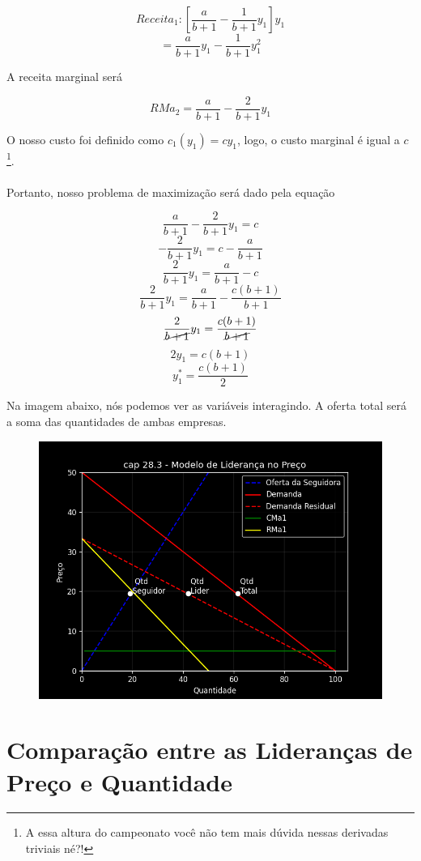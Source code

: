 \documentclass[a4paper,11pt,oneside]{book}
\theoremstyle{definition}
\theoremstyle{break}
\begin{document}
$$ Receita_1: \left[ \frac{a}{b+1} - \frac{1}{b+1}y_1 \right] y_1 $$
$$ = \frac{a}{b+1}y_1 - \frac{1}{b+1}y_1^2 $$

A receita marginal será

$$ RMa_2 = \frac{a}{b+1} - \frac{2}{b+1}y_1 $$

O nosso custo foi definido como $c_1(y_1) = cy_1$, logo, o custo marginal é igual a $c$\footnote{A essa altura do campeonato você não tem mais dúvida nessas derivadas triviais né?!}.
\\
\\
Portanto, nosso problema de maximização será dado pela equação

$$ \frac{a}{b+1} - \frac{2}{b+1}y_1 = c $$
$$ - \frac{2}{b+1}y_1 = c - \frac{a}{b+1} $$
$$ \frac{2}{b+1}y_1 = \frac{a}{b+1} - c $$
$$ \frac{2}{b+1}y_1 = \frac{a}{b+1} - \frac{c(b+1)}{b+1} $$
$$ \frac{2}{\cancel{b+1}}y_1 = \frac{c(b+1)}{\cancel{b+1}} $$
$$ 2y_1 = c(b+1) $$
$$ y_1^* = \frac{c(b+1)}{2} $$

Na imagem abaixo, nós podemos ver as variáveis interagindo. A oferta total será a soma das quantidades de ambas empresas.

\begin{figure}[H]
\centering
\includegraphics[scale=0.75]{cap28_3-lideranca_preco.png}
\end{figure}

\section{Comparação entre as Lideranças de Preço e Quantidade}
\end{document}
